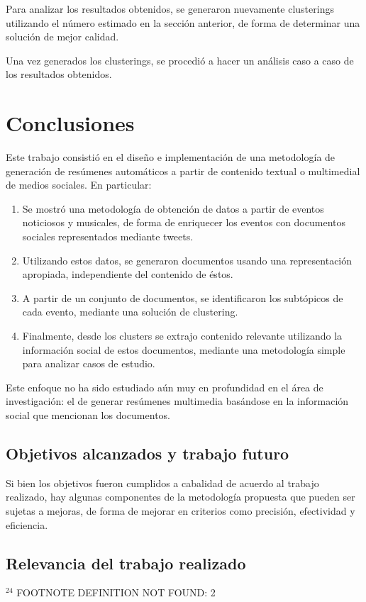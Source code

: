 \documentclass[upright, contnum]{umemoria}
\begin{document}
    Para analizar los resultados obtenidos, se generaron nuevamente
    clusterings utilizando el número estimado en la sección anterior, de
    forma de determinar una solución de mejor calidad.

    Una vez generados los clusterings, se procedió a hacer un análisis
    caso a caso de los resultados obtenidos.

    

   
\chapter{Conclusiones}
\label{sec-5}

\label{cap:conclusiones}

Este trabajo consistió en el diseño e implementación de una
metodología de generación de resúmenes automáticos a partir de
contenido textual o multimedial de medios sociales. En particular:

\begin{enumerate}
\item Se mostró una metodología de obtención de datos a partir de eventos
   noticiosos y musicales, de forma de enriquecer los eventos con
   documentos sociales representados mediante tweets.
\item Utilizando estos datos, se generaron documentos usando una
   representación apropiada, independiente del contenido de éstos.
\item A partir de un conjunto de documentos, se identificaron los
   subtópicos de cada evento, mediante una solución de clustering.
\item Finalmente, desde los clusters se extrajo contenido relevante
   utilizando la información social de estos documentos, mediante una
   metodología simple para analizar casos de estudio.
\end{enumerate}
Este enfoque no ha sido estudiado aún muy en profundidad en el área de
investigación: el de generar resúmenes multimedia basándose en la
información social que mencionan los documentos. 

\section{Objetivos alcanzados y trabajo futuro}
\label{sec-5.1}


Si bien los objetivos fueron cumplidos a cabalidad de acuerdo al
trabajo realizado, hay algunas componentes de la metodología propuesta
que pueden ser sujetas a mejoras, de forma de mejorar en criterios
como precisión, efectividad y eficiencia.

\section{Relevancia del trabajo realizado}
\label{sec-5.2}



























$^{24}$ FOOTNOTE DEFINITION NOT FOUND: 2
\end{document}
